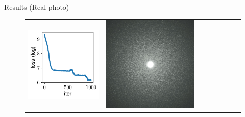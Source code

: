\documentclass[final]{beamer}
\newlength{\twocolwid}
\newlength{\resultwidth}
\begin{document}
\begin{frame}[t]
\begin{columns}[t]
\begin{column}{\twocolwid}
\begin{block}{Results (Real photo)}
\begin{figure}[t]
\begin{tabular}{ccrclccc}
            		\includegraphics[width=\resultwidth]{images/real/flake/loss.pdf} &
            		\includegraphics[width=\resultwidth]{images/real/flake/optim.jpg} &

\end{tabular}
\end{figure}
\end{block}
\end{column}
\end{columns}
\end{frame}
\end{document}

